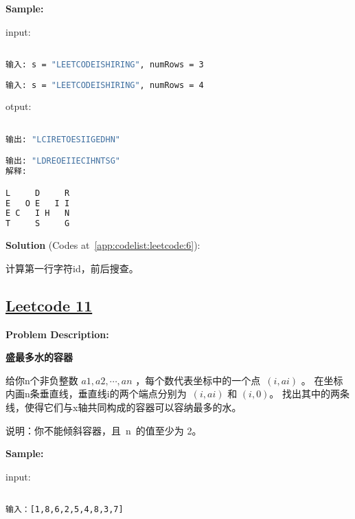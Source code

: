 \textbf{Sample:}\par

input:\par

\begin{lstlisting}[language=bash]

输入: s = "LEETCODEISHIRING", numRows = 3
  
输入: s = "LEETCODEISHIRING", numRows = 4


\end{lstlisting}

otput:\par

\begin{lstlisting}[language=bash]

输出: "LCIRETOESIIGEDHN"

输出: "LDREOEIIECIHNTSG"
解释:

L     D     R
E   O E   I I
E C   I H   N
T     S     G


\end{lstlisting}

\textbf{Solution }(Codes at~\ref{app:codelist:leetcode:6}):\par

计算第一行字符id，前后搜查。\par



\subsection{\href{https://leetcode-cn.com/}{Leetcode 11}}\label{app:problemlist:leetcode:11}

\textbf{Problem Description:}\par

\textbf{盛最多水的容器}\par

给你n个非负整数 $ a1, a2, \cdots, an $ ，每个数代表坐标中的一个点 $ (i, ai) $ 。
在坐标内画n条垂直线，垂直线i的两个端点分别为 $ (i, ai) $ 和 $ (i, 0) $。
找出其中的两条线，使得它们与x轴共同构成的容器可以容纳最多的水。\par

说明：你不能倾斜容器，且 n 的值至少为 2。\par


\textbf{Sample:}\par

input:\par

\begin{lstlisting}[language=bash]

输入：[1,8,6,2,5,4,8,3,7]


\end{lstlisting}

